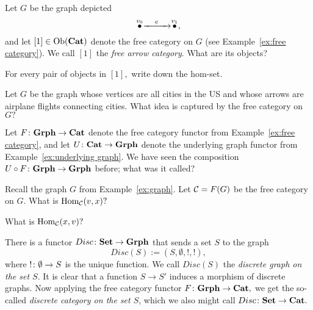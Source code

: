 \documentclass[../main/CT4S-EN-RU]{subfiles}
\begin{document}
\begin{exerciseENG}\label{exc:[1]}
Let $G$ be the graph depicted $$\stackrel{v_0}{\bullet}\xrightarrow{\ \ \;\;e\;\;\ \ }\stackrel{v_1}{\bullet},$$ and let $[1]\in\operatorname{Ob}({\mathbf{Cat}})$ denote the free category on $G$ (see Example~\ref{ex:free category}). We call $[1]$ the {\em free arrow category}.
\sexc What are its objects?
\item For every pair of objects in $[1],$ write down the hom-set.
\endsexc
\end{exerciseENG}

\begin{exerciseRUS}\label{exc:[1]}
\end{exerciseRUS}

\begin{exerciseENG}
Let $G$ be the graph whose vertices are all cities in the US and whose arrows are airplane flights connecting cities. What idea is captured by the free category on $G?$
\end{exerciseENG}

\begin{exerciseRUS}
\end{exerciseRUS}

\begin{exerciseENG}\label{exc:free underlying cat grph}
Let $F\colon{\mathbf{Grph}}\rightarrow{\mathbf{Cat}}$ denote the free category functor from Example~\ref{ex:free category}, and let $U\colon{\mathbf{Cat}}\rightarrow{\mathbf{Grph}}$ denote the underlying graph functor from Example~\ref{ex:underlying graph}. We have seen the composition $U\circ F\colon{\mathbf{Grph}}\rightarrow{\mathbf{Grph}}$ before; what was it called?
\end{exerciseENG}

\begin{exerciseRUS}\label{exc:free underlying cat grph}
\end{exerciseRUS}

\begin{exerciseENG}
Recall the graph $G$ from Example~\ref{ex:graph}. Let $\mathcal{C}=F(G)$ be the free category on $G.$
\sexc What is $\operatorname{Hom}_\mathcal{C}(v,x)?$
\item What is $\operatorname{Hom}_\mathcal{C}(x,v)?$
\endsexc
\end{exerciseENG}

\begin{exerciseRUS}
\end{exerciseRUS}

\begin{exampleENG}\label{ex:discrete graph discrete cat}
There is a functor $Disc\colon{\mathbf{Set}}\rightarrow{\mathbf{Grph}}$ that sends a set $S$ to the graph $$Disc(S):=(S,\emptyset,!,!),$$ where $!\colon\emptyset\rightarrow S$ is the unique function. We call $Disc(S)$ the {\em discrete graph on the set $S$}. It is clear that a function $S\to S'$ induces a morphism of discrete graphs. Now applying the free category functor $F\colon{\mathbf{Grph}}\rightarrow{\mathbf{Cat}},$ we get the so-called {\em discrete category on the set $S$}, which we also might call $Disc\colon{\mathbf{Set}}\rightarrow{\mathbf{Cat}}.$ 
\end{exampleENG}
\end{document}
